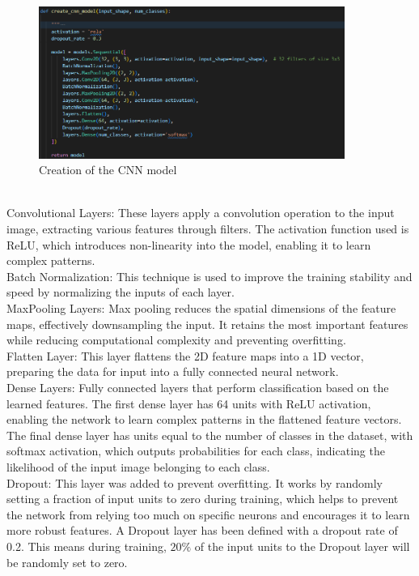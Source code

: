 \documentclass{article}
\begin{document}
\begin{figure}[H]
    \caption{Creation of the CNN model}
    \centering
    \includegraphics[width=10cm]{../imgFolder/create_cnn_model.png}
\end{figure}
\text{ }\\
Convolutional Layers: These layers apply a convolution operation to the input image,
extracting various features through filters.
The activation function used is ReLU,
which introduces non-linearity into the model, enabling it to learn complex patterns.\\\newline
Batch Normalization: This technique is used to improve the training stability and speed
by normalizing the inputs of each layer.\\\newline
MaxPooling Layers: Max pooling reduces the spatial dimensions of the feature maps,
effectively downsampling the input.
It retains the most important features while reducing computational
complexity and preventing overfitting.\\\newline
Flatten Layer: This layer flattens the 2D feature maps into a 1D vector,
preparing the data for input into a fully connected neural network.\\\newline
Dense Layers: Fully connected layers that perform classification based on the learned features.
The first dense layer has 64 units with ReLU activation, enabling the network to learn complex
patterns in the flattened feature vectors.
The final dense layer has units equal to the number of classes
in the dataset, with softmax activation, which outputs probabilities for each class,
indicating the likelihood of the input image belonging to each class.\\\newline
Dropout: This layer was added to prevent overfitting.
It works by randomly setting a fraction of input units to zero during training,
which helps to prevent the network from relying too much on specific neurons
and encourages it to learn more robust features.
A Dropout layer has been defined with a dropout rate of 0.2.
This means during training, ${20\%}$ of the input units to the Dropout layer will be randomly set to zero.\\\newline
\end{document}
